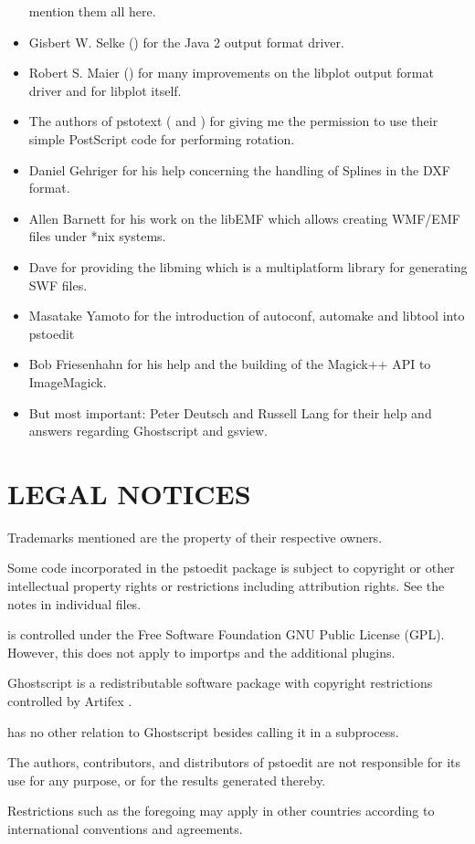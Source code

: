 \documentclass[english,a4paper]{article}
\begin{document}
\begin{itemize}
     mention them all here.
  \item Gisbert W. Selke () for the Java 2 output format driver.
  \item Robert S. Maier () for many improvements on
	the libplot output format driver and for libplot itself.
  \item The authors of pstotext ( and )
	for giving me the permission to use their simple PostScript code for
	performing rotation.
  \item Daniel Gehriger  for his help concerning the handling of Splines in the DXF format.
  \item Allen Barnett  for his work on the libEMF which allows creating WMF/EMF files under *nix systems.
  \item Dave  for providing the libming which is a multiplatform library for generating SWF files.
  \item Masatake Yamoto for the introduction of autoconf, automake and libtool into pstoedit
  \item Bob Friesenhahn for his help and the building of the Magick++ API to ImageMagick.
  \item But most important: Peter Deutsch  and Russell
     Lang  for their help and answers regarding
     Ghostscript and gsview.
\end{itemize}

\section{LEGAL NOTICES}

Trademarks mentioned are the property of their respective owners.

Some code incorporated in the pstoedit package is subject to copyright or
other intellectual property rights or restrictions including attribution
rights. See the notes in individual files.

 is controlled under the Free Software Foundation GNU Public
License (GPL). However, this does not apply to importps and the additional
plugins.

Ghostscript is a redistributable software package with copyright
restrictions controlled by Artifex .

 has no other relation to Ghostscript besides calling it in a
subprocess.

The authors, contributors, and distributors of pstoedit are not responsible
for its use for any purpose, or for the results generated thereby.

Restrictions such as the foregoing may apply in other countries according to
international conventions and agreements.


\LatexManEnd
\end{document}
